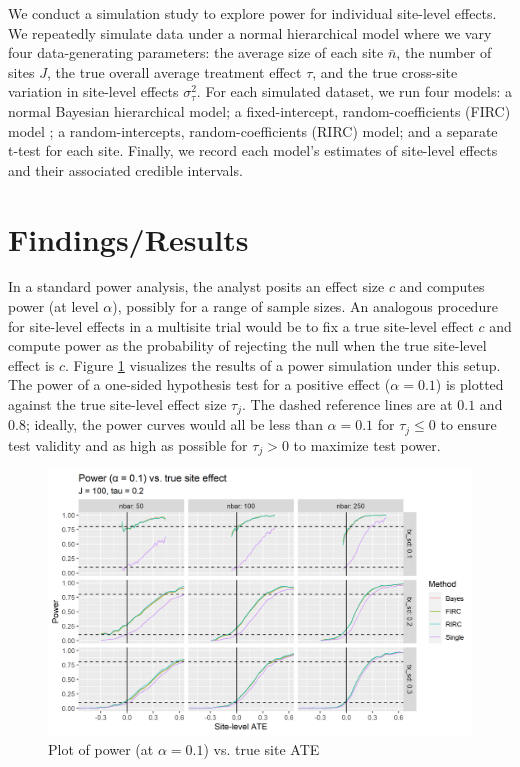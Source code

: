 \documentclass[]{article}
\begin{document}
We conduct a simulation study to explore power for individual site-level effects. 
We repeatedly simulate data under a normal hierarchical model where we vary four data-generating parameters: the average size of each site $\bar{n}$, the number of sites $J$, the true overall average treatment effect $\tau$, and the true cross-site variation in site-level effects $\sigma^2_\tau$.
For each simulated dataset, we run four models: a normal Bayesian hierarchical model; a fixed-intercept, random-coefficients (FIRC) model \citep{bloom2017using}; a random-intercepts, random-coefficients (RIRC) model; and a separate t-test for each site. Finally, we record each model’s estimates of site-level effects and their associated credible intervals.

\section{Findings/Results}

In a standard power analysis, the analyst posits an effect size $c$ and computes power (at level $\alpha$), possibly for a range of sample sizes.
An analogous procedure for site-level effects in a multisite trial would be to fix a true site-level effect $c$ and compute power as the probability of rejecting the null when the true site-level effect is $c$.
Figure \ref{fig:power_plot} visualizes the results of a power simulation under this setup.
The power of a one-sided hypothesis test for a positive effect ($\alpha = 0.1$) is plotted against the true site-level effect size $\tau_j$.
The dashed reference lines are at $0.1$ and $0.8$; 
ideally, the power curves would all be less than $\alpha = 0.1$ for $\tau_j \leq 0$ to ensure test validity and as high as possible for $\tau_j > 0$ to maximize test power.
\begin{figure}[ht]
	\centering
	\includegraphics[width=\textwidth]{power_plot_J100}
	\caption{Plot of power (at $\alpha = 0.1$) vs. true site ATE}
	\label{fig:power_plot}
\end{figure}
\end{document}
